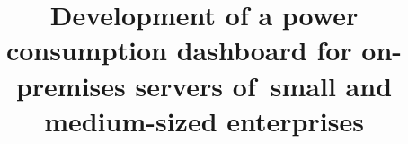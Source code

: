 \title{Development of a power consumption dashboard for on-premises servers of small and medium-sized enterprises}
